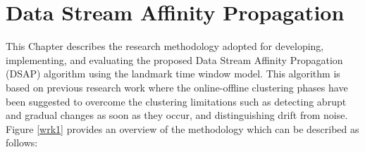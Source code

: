 \documentclass[../UNBThesis2.tex]{subfiles}
\begin{document}
\chapter{Data Stream Affinity Propagation}



This Chapter describes the research methodology adopted for developing, implementing, and evaluating the proposed Data Stream Affinity Propagation (DSAP) algorithm using the landmark time window model. This algorithm is based on previous research work where the online-offline clustering phases have been suggested to overcome the clustering limitations such as detecting abrupt and gradual changes as soon as they occur, and distinguishing drift from noise. Figure \ref{wrk1} provides an overview of the methodology which can be described as follows:

\end{document}
